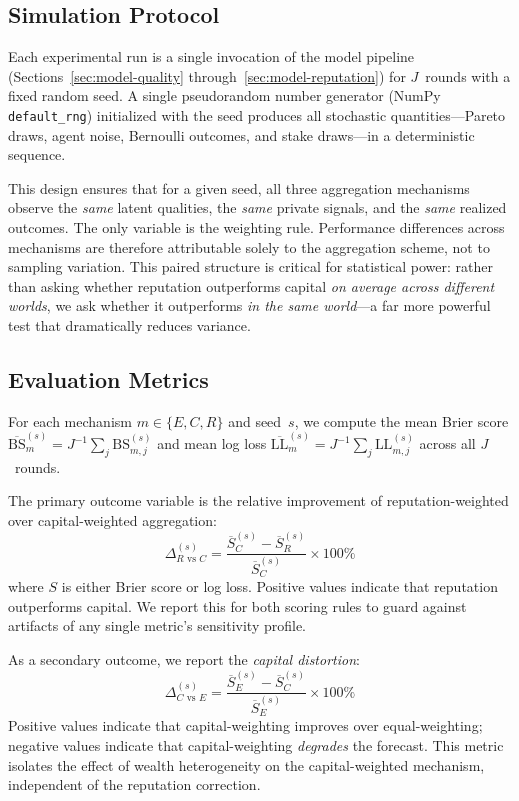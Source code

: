 \documentclass[conference]{IEEEtran}
\begin{document}
\subsection{Simulation Protocol}
\label{sec:experiments-protocol}

Each experimental run is a single invocation of the model pipeline (Sections~\ref{sec:model-quality} through~\ref{sec:model-reputation}) for $J$~rounds with a fixed random seed. A single pseudorandom number generator (NumPy \texttt{default\_rng}) initialized with the seed produces all stochastic quantities---Pareto draws, agent noise, Bernoulli outcomes, and stake draws---in a deterministic sequence.

This design ensures that for a given seed, all three aggregation mechanisms observe the \emph{same} latent qualities, the \emph{same} private signals, and the \emph{same} realized outcomes. The only variable is the weighting rule. Performance differences across mechanisms are therefore attributable solely to the aggregation scheme, not to sampling variation. This paired structure is critical for statistical power: rather than asking whether reputation outperforms capital \emph{on average across different worlds}, we ask whether it outperforms \emph{in the same world}---a far more powerful test that dramatically reduces variance.

\subsection{Evaluation Metrics}
\label{sec:experiments-metrics}

For each mechanism $m \in \{E, C, R\}$ and seed~$s$, we compute the mean Brier score $\overline{\text{BS}}_m^{(s)} = J^{-1} \sum_j \text{BS}_{m,j}^{(s)}$ and mean log loss $\overline{\text{LL}}_m^{(s)} = J^{-1} \sum_j \text{LL}_{m,j}^{(s)}$ across all $J$~rounds.

The primary outcome variable is the relative improvement of reputation-weighted over capital-weighted aggregation:
\begin{equation}
    \Delta_{R \text{ vs } C}^{(s)} = \frac{\overline{S}_C^{(s)} - \overline{S}_R^{(s)}}{\overline{S}_C^{(s)}} \times 100\%
\end{equation}
where $S$ is either Brier score or log loss. Positive values indicate that reputation outperforms capital. We report this for both scoring rules to guard against artifacts of any single metric's sensitivity profile.

As a secondary outcome, we report the \emph{capital distortion}:
\begin{equation}
    \Delta_{C \text{ vs } E}^{(s)} = \frac{\overline{S}_E^{(s)} - \overline{S}_C^{(s)}}{\overline{S}_E^{(s)}} \times 100\%
\end{equation}
Positive values indicate that capital-weighting improves over equal-weighting; negative values indicate that capital-weighting \emph{degrades} the forecast. This metric isolates the effect of wealth heterogeneity on the capital-weighted mechanism, independent of the reputation correction.
\end{document}
